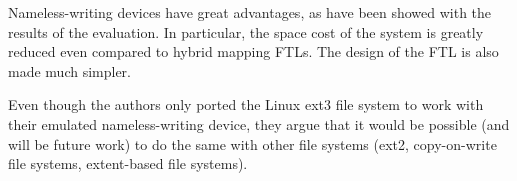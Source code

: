 \documentclass[twocolumn,a4paper,10pt]{article}
\begin{document}
Nameless-writing devices have great advantages, as have been showed with the
results of the evaluation. In particular, the space cost of the system is
greatly reduced even compared to hybrid mapping FTLs. The design of the FTL is
also made much simpler.

Even though the authors only ported the Linux ext3 file system to work with
their emulated nameless-writing device, they argue that it would be possible
(and will be future work) to do the same with other file systems (ext2,
copy-on-write file systems, extent-based file systems).
\end{document}
